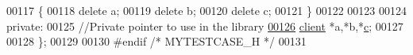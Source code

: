 \begin{DoxyCode}
00117   \{
00118       \textcolor{keyword}{delete} a;
00119       \textcolor{keyword}{delete} b;
00120       \textcolor{keyword}{delete} c;
00121   \}
00122 
00123     
00124 \textcolor{keyword}{private}:
00125     \textcolor{comment}{//Private pointer to use in the library}
\hypertarget{_my_test_c_ase_8h_source.tex_l00126}{}\hyperlink{class_my_test_c_ase_a9b2a4413041a47316ddc140e862e3bcc_a9b2a4413041a47316ddc140e862e3bcc}{00126}     \hyperlink{classclient}{client} *a,*b,*\hyperlink{class_my_test_c_ase_a9b2a4413041a47316ddc140e862e3bcc_a9b2a4413041a47316ddc140e862e3bcc}{c};
00127     
00128 \};
00129 
00130 \textcolor{preprocessor}{#endif }\textcolor{comment}{/* MYTESTCASE\_H */}\textcolor{preprocessor}{}
00131 
\end{DoxyCode}
